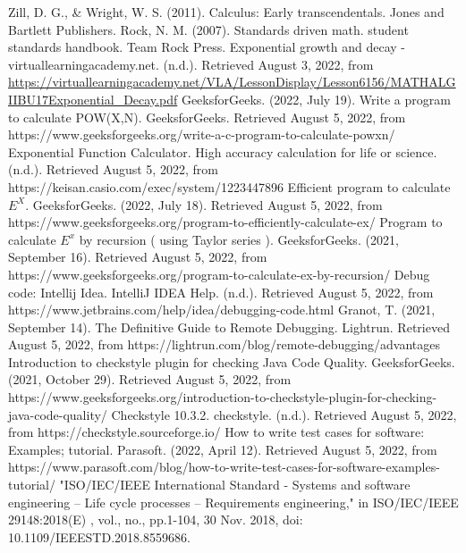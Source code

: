 \documentclass[a4paper,12pt]{report}
\begin{document}
\begin{thebibliography}{9}
 Zill, D. G., \& Wright, W. S. (2011). Calculus: Early transcendentals. Jones and Bartlett Publishers.
 Rock, N. M. (2007). Standards driven math. student standards handbook. Team Rock Press.
Exponential growth and decay - virtuallearningacademy.net. (n.d.). Retrieved August 3, 2022, from  \url{https://virtuallearningacademy.net/VLA/LessonDisplay/Lesson6156/MATHALGIIBU17Exponential_Decay.pdf}
GeeksforGeeks. (2022, July 19). Write a program to calculate POW(X,N). GeeksforGeeks. Retrieved August 5, 2022, from https://www.geeksforgeeks.org/write-a-c-program-to-calculate-powxn/
Exponential Function Calculator. High accuracy calculation for life or science. (n.d.). Retrieved August 5, 2022, from https://keisan.casio.com/exec/system/1223447896
Efficient program to calculate $E^X$. GeeksforGeeks. (2022, July 18). Retrieved August 5, 2022, from https://www.geeksforgeeks.org/program-to-efficiently-calculate-ex/
Program to calculate $E^x$ by recursion ( using Taylor series ). GeeksforGeeks. (2021, September 16). Retrieved August 5, 2022, from https://www.geeksforgeeks.org/program-to-calculate-ex-by-recursion/
Debug code: Intellij Idea. IntelliJ IDEA Help. (n.d.). Retrieved August 5, 2022, from https://www.jetbrains.com/help/idea/debugging-code.html
Granot, T. (2021, September 14). The Definitive Guide to Remote Debugging. Lightrun. Retrieved August 5, 2022, from https://lightrun.com/blog/remote-debugging/advantages
Introduction to checkstyle plugin for checking Java Code Quality. GeeksforGeeks. (2021, October 29). Retrieved August 5, 2022, from https://www.geeksforgeeks.org/introduction-to-checkstyle-plugin-for-checking-java-code-quality/
Checkstyle 10.3.2. checkstyle. (n.d.). Retrieved August 5, 2022, from https://checkstyle.sourceforge.io/
How to write test cases for software: Examples; tutorial. Parasoft. (2022, April 12). Retrieved August 5, 2022, from https://www.parasoft.com/blog/how-to-write-test-cases-for-software-examples-tutorial/
"ISO/IEC/IEEE International Standard - Systems and software engineering -- Life cycle processes -- Requirements engineering," in ISO/IEC/IEEE 29148:2018(E) , vol., no., pp.1-104, 30 Nov. 2018, doi: 10.1109/IEEESTD.2018.8559686.
\end{thebibliography}
\end{document}
